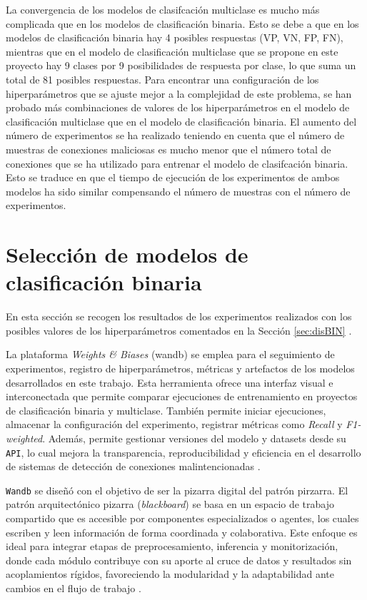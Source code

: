 La convergencia de los modelos de clasifcación multiclase es mucho más complicada que en los modelos de clasificación binaria. Esto se debe a que en los modelos de clasificación binaria hay 4 posibles respuestas (VP, VN, FP, FN), mientras que en el  modelo de clasificación multiclase que se propone en este proyecto hay 9 clases por 9 posibilidades de respuesta por clase, lo que suma un total de 81 posibles respuestas. Para encontrar una configuración de los hiperparámetros que se ajuste mejor a la complejidad de este problema, se han probado más combinaciones de valores de los hiperparámetros en el modelo de clasificación multiclase que en el modelo de clasificación binaria. El aumento del número de experimentos se ha realizado teniendo en cuenta que el número de muestras de conexiones maliciosas es mucho menor que el número total de conexiones que se ha utilizado para entrenar el modelo de clasifcación binaria. Esto se traduce en que el tiempo de ejecución de los experimentos de ambos modelos ha sido similar compensando el número de muestras con el número de experimentos.




\section{Selección de modelos de clasificación binaria}
En esta sección se recogen los resultados de los experimentos realizados con los posibles valores de los hiperparámetros comentados en la Sección \ref{sec:disBIN} .

La plataforma \textit{Weights \& Biases} (wandb) se emplea para el seguimiento de experimentos, registro de hiperparámetros, métricas y artefactos de los modelos desarrollados en este trabajo. Esta herramienta ofrece una interfaz visual e interconectada que permite comparar ejecuciones de entrenamiento en proyectos de clasificación binaria y multiclase. También permite iniciar ejecuciones, almacenar la configuración del experimento, registrar métricas como \textit{Recall} y \textit{F1-weighted}. Además, permite gestionar versiones del modelo y datasets desde su \texttt{API}, lo cual mejora la transparencia, reproducibilidad y eficiencia en el desarrollo de sistemas de detección de conexiones malintencionadas \cite{wandb_tracking}.

\texttt{Wandb} se diseñó con el objetivo de ser la pizarra digital del patrón pirzarra. El patrón arquitectónico pizarra (\textit{blackboard}) se basa en un espacio de trabajo compartido que es accesible por componentes especializados o agentes, los cuales escriben y leen información de forma coordinada y colaborativa. Este enfoque es ideal para integrar etapas de preprocesamiento, inferencia y monitorización, donde cada módulo contribuye con su aporte al cruce de datos y resultados sin acoplamientos rígidos, favoreciendo la modularidad y la adaptabilidad ante cambios en el flujo de trabajo \cite{blackboard_architecture}.

